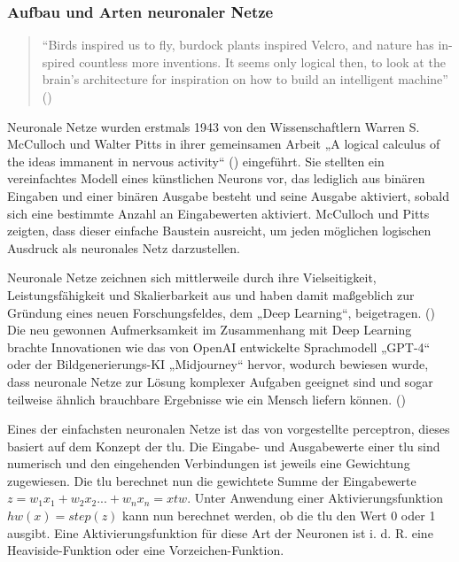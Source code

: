\subsubsection{Aufbau und Arten neuronaler Netze}

\begin{quote}
"`Birds inspired us to fly, burdock plants inspired Velcro, and nature has in- spired countless more inventions. It seems only logical then, to look at the brain’s architecture for inspiration on how to build an intelligent machine"' (\cite[S. 279]{Geron2019})
\end{quote}

Neuronale Netze wurden erstmals 1943 von den Wissenschaftlern Warren S. McCulloch und Walter Pitts in ihrer gemeinsamen Arbeit „A logical calculus of the ideas immanent in nervous activity“ (\cite{McCulloch1943}) eingeführt. Sie stellten ein vereinfachtes Modell eines künstlichen Neurons vor, das lediglich aus binären Eingaben und einer binären Ausgabe besteht und seine Ausgabe aktiviert, sobald sich eine bestimmte Anzahl an Eingabewerten aktiviert. McCulloch und Pitts zeigten, dass dieser einfache Baustein ausreicht, um jeden möglichen logischen Ausdruck als neuronales Netz darzustellen.

Neuronale Netze zeichnen sich mittlerweile durch ihre Vielseitigkeit, Leistungsfähigkeit und Skalierbarkeit aus und haben damit maßgeblich zur Gründung eines neuen Forschungsfeldes, dem „Deep Learning“, beigetragen. (\cite{Geron2019}) Die neu gewonnen Aufmerksamkeit im Zusammenhang mit Deep Learning brachte Innovationen wie das von OpenAI entwickelte Sprachmodell „GPT-4“ oder der Bildgenerierungs-KI „Midjourney“ hervor, wodurch bewiesen wurde, dass neuronale Netze zur Lösung komplexer Aufgaben geeignet sind und sogar teilweise ähnlich brauchbare Ergebnisse wie ein Mensch liefern können. (\cite{OpenAI2024})

Eines der einfachsten neuronalen Netze ist das von \cite{Rosenblatt1958} vorgestellte \gls{perceptron}, dieses basiert auf dem Konzept der \gls{tlu}. Die Eingabe- und Ausgabewerte einer \gls{tlu} sind numerisch und den eingehenden Verbindungen ist jeweils eine Gewichtung zugewiesen. Die \gls{tlu} berechnet nun die gewichtete Summe der Eingabewerte \(z=w_1x_1+w_2x_2 ... +w_nx_n=xtw\). Unter Anwendung einer Aktivierungsfunktion \(hw(x)=step(z)\) kann nun berechnet werden, ob die \gls{tlu} den Wert 0 oder 1 ausgibt. Eine Aktivierungsfunktion für diese Art der Neuronen ist i. d. R. eine Heaviside-Funktion oder eine Vorzeichen-Funktion. \cite[S. 284 ff.]{Geron2019}

